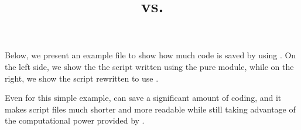 \documentclass{article}
\title{\casadi{} vs. \mpctools{}}
\begin{document}
\maketitle

Below, we present an example file to show how much code is saved by using \mpctools{}.
On the left side, we show the the script written using the pure \casadi{} module, while on the right, we show the script rewritten to use \mpctools{}.

\hspace{1em}



Even for this simple example, \mpctools{} can save a significant amount of coding, and it makes script files much shorter and more readable while still taking advantage of the computational power provided by \casadi{}.
\end{document}
